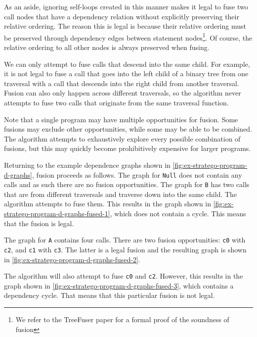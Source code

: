 As an aside, ignoring self-loops created in this manner makes it legal to fuse two call nodes that have a dependency relation without explicitly preserving their relative ordering. The reason this is legal is because their relative ordering must be preserved through dependency edges between statement nodes\footnote{We refer to the TreeFuser paper for a formal proof of the soundness of fusion\cite{SakkaS017}}. Of course, the relative ordering to all other nodes is always preserved when fusing.

We can only attempt to fuse calls that descend into the same child. For example, it is not legal to fuse a call that goes into the left child of a binary tree from one traversal with a call that descends into the right child from another traversal. Fusion can also only happen across different traversals, so the algorithm never attempts to fuse two calls that originate from the same traversal function.

Note that a single program may have multiple opportunities for fusion. Some fusions may exclude other opportunities, while some may be able to be combined. The algorithm attempts to exhaustively explore every possible combination of fusions, but this may quickly become prohibitively expensive for larger programs. 

Returning to the example dependence graphs shown in \autoref{fig:ex-stratego-program-d-graphs}, fusion proceeds as follows. The graph for \texttt{Null} does not contain any calls and as such there are no fusion opportunities. The graph for \texttt{B} has two calls that are from different traversals and traverse down into the same child. The algorithm attempts to fuse them. This results in the graph shown in \autoref{fig:ex-stratego-program-d-graphs-fused-1}, which does not contain a cycle. This means that the fusion is legal.

The graph for \texttt{A} contains four calls. There are two fusion opportunities: \texttt{c0} with \texttt{c2}, and \texttt{c1} with \texttt{c3}. The latter is a legal fusion and the resulting graph is shown in \autoref{fig:ex-stratego-program-d-graphs-fused-2}. 

The algorithm will also attempt to fuse \texttt{c0} and \texttt{c2}. However, this results in the graph shown in \autoref{fig:ex-stratego-program-d-graphs-fused-3}, which contains a dependency cycle. That means that this particular fusion is not legal.

